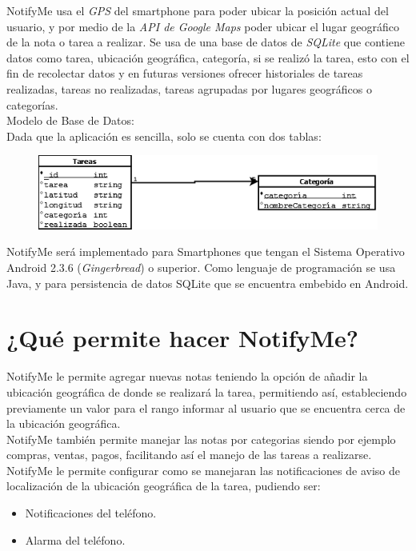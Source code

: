 \documentclass[a4paper,11pt]{article}
\begin{document}
NotifyMe usa el \emph{GPS} del smartphone para poder ubicar la posición actual del usuario, y por medio de la \emph{API de Google Maps} poder ubicar el lugar geográfico de la nota o tarea a realizar. Se usa de una base de datos de \emph{SQLite} que contiene datos como tarea, ubicación geográfica, categoría, si se realizó la tarea, esto con el fin de recolectar datos y en futuras versiones ofrecer historiales de tareas realizadas, tareas no realizadas, tareas agrupadas por lugares geográficos o categorías. \\
 
Modelo de Base de Datos: \\

Dada que la aplicación es sencilla, solo se cuenta con dos tablas: \\

\begin{figure}[h]
\centering
\includegraphics[width=0.7\linewidth]{./DB}
\caption{}
\label{fig 1: Modelo ER de Base de Datos de NotifyMe}
\end{figure}

NotifyMe será implementado para Smartphones que tengan el Sistema Operativo Android 2.3.6 (\emph{Gingerbread}) o superior. Como lenguaje de programación se usa Java, y para persistencia de datos SQLite que se encuentra embebido en Android.

\section{¿Qué permite hacer NotifyMe?}

NotifyMe le permite agregar nuevas notas teniendo la opción de añadir la ubicación geográfica de donde se realizará la tarea, permitiendo así, estableciendo previamente un valor para el rango informar al usuario que se encuentra cerca
de la ubicación geográfica. \\

NotifyMe también permite manejar las notas por categorias siendo por ejemplo compras, ventas, pagos, facilitando así el manejo de las tareas a realizarse.\\

NotifyMe le permite configurar como se manejaran las notificaciones de aviso de localización de la ubicación geográfica de la tarea, pudiendo ser:
\begin{itemize}
	\item Notificaciones del teléfono.
	\item Alarma del teléfono.
\end{itemize}
\end{document}
